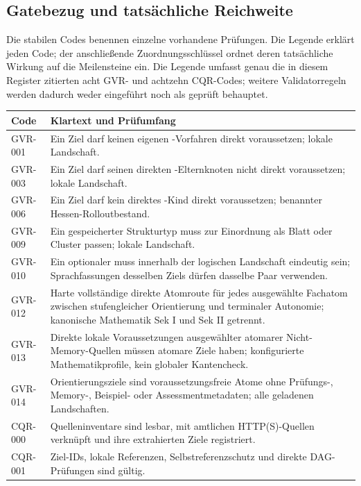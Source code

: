 \subsection{Gatebezug und tatsächliche Reichweite}
\label{sec:rule-code-legend}
Die stabilen Codes benennen einzelne vorhandene Prüfungen. Die Legende erklärt jeden Code; der anschließende Zuordnungsschlüssel ordnet deren tatsächliche Wirkung auf die Meilensteine ein. Die Legende umfasst genau die in diesem Register zitierten acht GVR- und achtzehn CQR-Codes; weitere Validatorregeln werden dadurch weder eingeführt noch als geprüft behauptet.

\begingroup\small
\begin{longtable}{@{}P{23mm}P{125mm}@{}}
\toprule
Code & Klartext und Prüfumfang\\
\midrule\endhead
GVR-001 & Ein Ziel darf keinen eigenen -Vorfahren direkt voraussetzen; lokale Landschaft.\\
GVR-003 & Ein Ziel darf seinen direkten -Elternknoten nicht direkt voraussetzen; lokale Landschaft.\\
GVR-006 & Ein Ziel darf kein direktes -Kind direkt voraussetzen; benannter Hessen-Rolloutbestand.\\
GVR-009 & Ein gespeicherter Strukturtyp muss zur Einordnung als Blatt oder Cluster passen; lokale Landschaft.\\
GVR-010 & Ein optionaler  muss innerhalb der logischen Landschaft eindeutig sein; Sprachfassungen desselben Ziels dürfen dasselbe Paar verwenden.\\
GVR-012 & Harte vollständige direkte Atomroute für jedes ausgewählte Fachatom zwischen stufengleicher Orientierung und terminaler Autonomie; kanonische Mathematik Sek I und Sek II getrennt.\\
GVR-013 & Direkte lokale Voraussetzungen ausgewählter atomarer Nicht-Memory-Quellen müssen atomare Ziele haben; konfigurierte Mathematikprofile, kein globaler Kantencheck.\\
GVR-014 & Orientierungsziele sind voraussetzungsfreie Atome ohne Prüfungs-, Memory-, Beispiel- oder Assessmentmetadaten; alle geladenen Landschaften.\\
\midrule
CQR-000 & Quelleninventare sind lesbar, mit amtlichen HTTP(S)-Quellen verknüpft und ihre extrahierten Ziele registriert.\\
CQR-001 & Ziel-IDs, lokale Referenzen, Selbstreferenzschutz und direkte DAG-Prüfungen sind gültig.\\

\end{longtable}
